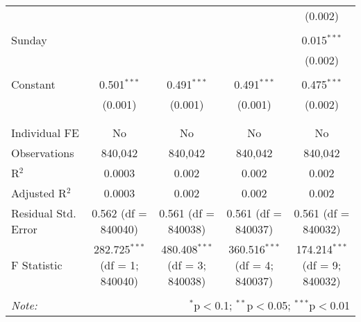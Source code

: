 \documentclass[
]{article}
\begin{document}
\begin{table}[!htbp]
{\begin{tabular}{@{\extracolsep{5pt}}lcccc}
  &  &  &  & (0.002) \\ 
  & & & & \\ 
 Sunday &  &  &  & 0.015$^{***}$ \\ 
  &  &  &  & (0.002) \\ 
  & & & & \\ 
 Constant & 0.501$^{***}$ & 0.491$^{***}$ & 0.491$^{***}$ & 0.475$^{***}$ \\ 
  & (0.001) & (0.001) & (0.001) & (0.002) \\ 
  & & & & \\ 
\hline \\[-1.8ex] 
Individual FE & No & No & No & No \\ 
Observations & 840,042 & 840,042 & 840,042 & 840,042 \\ 
R$^{2}$ & 0.0003 & 0.002 & 0.002 & 0.002 \\ 
Adjusted R$^{2}$ & 0.0003 & 0.002 & 0.002 & 0.002 \\ 
Residual Std. Error & 0.562 (df = 840040) & 0.561 (df = 840038) & 0.561 (df = 840037) & 0.561 (df = 840032) \\ 
F Statistic & 282.725$^{***}$ (df = 1; 840040) & 480.408$^{***}$ (df = 3; 840038) & 360.516$^{***}$ (df = 4; 840037) & 174.214$^{***}$ (df = 9; 840032) \\ 
\hline 
\hline \\[-1.8ex] 
\textit{Note:}  & \multicolumn{4}{r}{$^{*}$p$<$0.1; $^{**}$p$<$0.05; $^{***}$p$<$0.01} \\ 
\end{tabular}
} 
\end{table} 
\newpage
\end{document}

